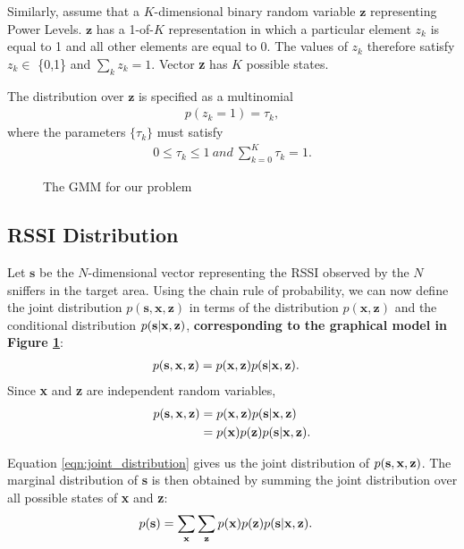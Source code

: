 Similarly, assume that a $K$-dimensional binary random variable $\mathbf{z}$ representing Power Levels. $\mathbf{z}$ has a 1-of-$K$ representation in which a particular element $z_{k}$ is equal to 1 and all other elements are equal to 0. The values of $z_{k}$ therefore satisfy $z_{k} \in$ \{0,1\} and $\sum_{k} z_{k} = 1$. Vector {\bf z} has $K$ possible states.

The distribution over $\mathbf{z}$ is specified as a multinomial 
\begin{align}
p(z_{k} = 1) = \tau_{k},
\end{align}
where the parameters $\{\tau_{k}\}$ must satisfy
\begin{align}
0 \le \tau_{k} \le 1 \ and \  \sum_{k=0}^{K} \tau_{k} = 1.
\end{align}


\begin{figure} [h!]
\centering
{}
\caption{The GMM for our problem}
\label{fig:gmm}
\end{figure}


\subsection{RSSI Distribution}
\label{subsec:constructingthedistributionovertheobservedsignalstrengths}

Let $\mathbf{s}$ be the $N$-dimensional vector representing the RSSI observed by the $N$ sniffers in the target area. 
Using the chain rule of probability, we can now define the joint distribution $p(\mathbf{s}, \mathbf{x},\mathbf{z})$ in terms of the distribution $p(\mathbf{x},\mathbf{z})$ and the conditional distribution $p( {\bf s} | {\bf x}, {\bf z})$, 
\textbf{corresponding to the graphical model in Figure \ref{fig:gmm}}:
\begin{align}
p( {\bf s}, {\bf x}, {\bf z}) &= p( {\bf x}, {\bf z}) p( {\bf s} | {\bf x}, {\bf z}).
\end{align}
Since {\bf x} and {\bf z} are independent random variables,
\begin{align}
p( {\bf s}, {\bf x}, {\bf z}) &= p( {\bf x}, {\bf z}) p( {\bf s} | {\bf x}, {\bf z}) \nonumber \\
&= p({\bf x})p({\bf z})p( {\bf s} | {\bf x}, {\bf z}). \label{eqn:joint_distribution}
\end{align}

Equation \ref{eqn:joint_distribution} gives us the joint distribution of $ p( {\bf s}, {\bf x}, {\bf z}) $. The marginal distribution of {\bf s} is then obtained by summing the joint distribution over all possible states of {\bf x} and {\bf z}:
\begin{align}
p( {\bf s}) & = \sum_{\bf x}\sum_{\bf z} p({\bf x})p({\bf z})p({\bf s}|{\bf x}, {\bf z}).\label{eqn:marginal_distribution1}
\end{align}

